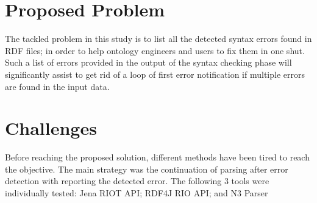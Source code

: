 \section{Proposed Problem } 	
The tackled problem in this study is to list all the detected syntax errors found in RDF files; in order to help ontology engineers and users to fix them in one shut. Such a list of errors provided in the output of the syntax checking phase will significantly assist to get rid of a loop of first error notification if multiple errors are found in the input data.  

\section{Challenges }
Before reaching the proposed solution, different methods have been tired to reach the objective. The main strategy was the continuation of parsing after error detection with reporting the detected error. The following 3 tools were individually tested: Jena RIOT API; RDF4J RIO API; and  N3 Parser %


